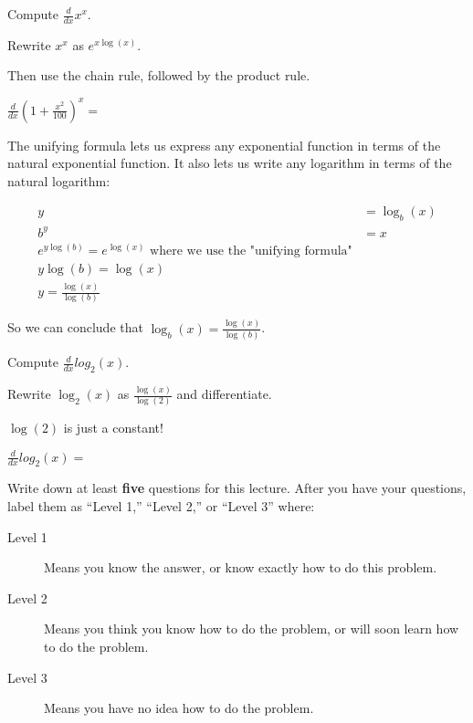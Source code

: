 \documentclass{ximera}
\begin{document}
\begin{question}
	Compute $\frac{d}{dx} x^x$.
	\begin{solution}
		\begin{hint}
			Rewrite $x^x$ as $e^{x\log(x)}$.
		\end{hint}
		\begin{hint}
			Then use the chain rule, followed by the product rule.
		\end{hint}
		$\frac{d}{dx} (1+\frac{x^2}{100})^x = $ 
	\end{solution}
\end{question}

The unifying formula lets us express any exponential function in terms of the natural exponential function.  It also lets us write any logarithm in terms of the natural logarithm:

\begin{align*}
	y &= \log_b(x)\\
	b^y &=  x\\
	e^{y\log(b)} = e^{\log(x)} \text{ where we use the "unifying formula"}\\
	y\log(b) = \log(x)\\
	y = \frac{\log(x)}{\log(b)}
\end{align*}

So we can conclude that $\log_b(x) = \frac{\log(x)}{\log(b)}$.

\begin{question}
	Compute $\frac{d}{dx} log_2(x)$.
	\begin{solution}
		\begin{hint}
			Rewrite $\log_2(x)$ as $\frac{\log(x)}{\log(2)}$ and differentiate.
		\end{hint}
		\begin{hint}
			$\log(2)$ is just a constant!
		\end{hint}
		$\frac{d}{dx} log_2(x)=$\answer{1/(x*log(2))}
	\end{solution}
\end{question}

Write down at least \textbf{five} questions for this lecture. After
you have your questions, label them as ``Level 1,'' ``Level 2,'' or ``Level 3'' where:
\begin{description}
\item[Level 1] Means you know the answer, or know exactly how to do this problem.
\item[Level 2] Means you think you know how to do the problem, or will soon learn how to do the problem.
\item[Level 3] Means you have no idea how to do the problem. 
\end{description}
\begin{question}
  \begin{freeResponse}
  \end{freeResponse}
\end{question}
\end{document}
